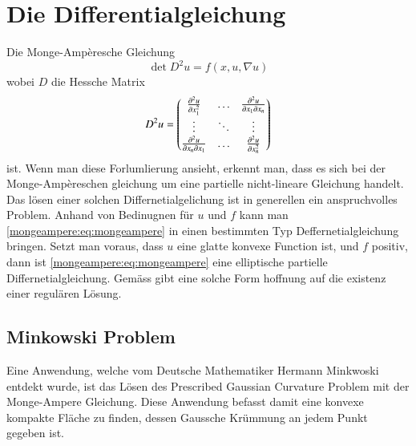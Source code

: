 %
%
%
%
\section{Die Differentialgleichung\label{mongeampere:section:teil0}}
Die Monge-Ampèresche Gleichung
\begin{equation}
  \det D^2 u = f(x, u, \nabla u)
  \label{mongeampere:eq:mongeampere}
\end{equation}
wobei $D$ die Hessche Matrix
\begin{equation}
  D^2 u =
  \begin{pmatrix}
    \pdv[2]{u}{x_1} & \dots &\pdv{u}{x_1}{x_n} \\
  \vdots & \ddots & \vdots \\
  \pdv{u}{x_n}{x_1} & \dots &\pdv[2]{u}{x_n} \\
  \end{pmatrix}
  \label{mongeampere:eq:hess}
\end{equation}
ist.
Wenn man diese Forlumlierung ansieht, erkennt man, dass es sich bei der Monge-Ampèreschen gleichung um eine partielle
nicht-lineare Gleichung handelt.
Das lösen einer solchen Differnetialgelichung ist in generellen ein anspruchvolles Problem.
Anhand von Bedinugnen für $u$ und $f$ kann man \eqref{mongeampere:eq:mongeampere} 
in einen bestimmten Typ Deffernetialgleichung bringen.
Setzt man voraus, dass $u$ eine glatte konvexe Function ist, und $f$ positiv, dann ist \eqref{mongeampere:eq:mongeampere}
eine elliptische partielle Differnetialgleichung.
Gemäss \cite{figalli2018mongeampereequation} gibt eine solche Form hoffnung auf die existenz einer regulären Lösung.

\subsection{Minkowski Problem}
Eine Anwendung, welche vom Deutsche Mathematiker Hermann Minkwoski entdekt wurde, ist das Lösen des
Prescribed Gaussian Curvature Problem mit der Monge-Ampere Gleichung.
Diese Anwendung befasst damit eine konvexe kompakte Fläche zu finden, dessen Gaussche Krümmung 
an jedem Punkt gegeben ist.

